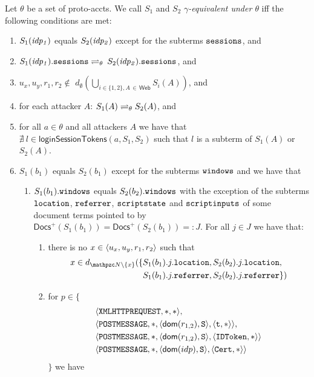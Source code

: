 \begin{theorem}
  \begin{definition}\label{def:rp:eq-of-states}
    Let $\theta$ be a set of proto-accts. %
    We call $S_1$ and $S_2$ \emph{$\gamma$-equivalent under 
    $\theta$} iff the following conditions are met:
    \begin{enumerate}
    \item\label{eqs:rp:idp} 
      $S_1(\mathit{idp_1})$ equals $S_2(\mathit{idp_2})$ except
      for the subterms $\mathtt{sessions}$, and
    \item\label{eqs:rp:idp-sessions} 
      $S_1(\mathit{idp_1}).\mathtt{sessions} \rightleftharpoons_{\theta}$ 
      $S_2(\mathit{idp_2}).\mathtt{sessions}$, and
    \item\label{eqs:rp:att-unknown}
      $u_x, u_y, r_1, r_2 \not\in $
      $d_\emptyset(\bigcup_{i\in\{1,2\},A\,\in\,\mathsf{Web}}S_i(A))$, and
    \item\label{eqs:rp:att} 
      for each attacker $A$:
      $S_1(A) \rightleftharpoons_{\theta} S_2(A)$, and
    \item\label{eqs:rp:att-not-l} 
      for all $a\in\theta$ and all attackers $A$ we have that
      $\nexists\ l \in \mathsf{loginSessionTokens}(a,S_1,S_2)$ 
      such that $l$ is a subterm of $S_1(A)$ or $S_2(A)$.
    \item\label{eqs:rp:b} 
      $S_1(b_1)$ equals $S_2(b_1)$ except for the subterms 
      $\mathtt{windows}$ and we have that
      \begin{enumerate}
      \item\label{eqs:rp:b:w}
        $S_1(b_1).\mathtt{windows}$ equals $S_2(b_2).\mathtt{windows}$ 
        with the exception of the subterms $\mathtt{location}$, $\mathtt{referrer}$, $\mathtt{scriptstate}$ 
        and $\mathtt{scriptinputs}$ of some document terms pointed 
        to by $\mathsf{Docs}^+(S_1(b_1)) = \mathsf{Docs}^+(S_2(b_1)) =: J$. 
        For all $j \in J$ we have that: 
        \begin{enumerate}
        \item there is no $x\in\langle {{}u_x, u_y, r_1, r_2} \rangle$ such that
          \begin{align*}
            x \in d_{\nonces \setminus \{x\}}(\{&S_1(b_1).j.\str{location}
            ,  S_2(b_2).j.\str{location},\\ & S_1(b_1).j.\str{referrer} , 
            S_2(b_2).j.\str{referrer}\})
          \end{align*}
        \item \label{eqs:rp:b:w:scriptinputs} for $p \in \{$
          \begin{align*}
            & \langle\mathtt{XMLHTTPREQUEST},*,*\rangle,\\
            & \langle\mathtt{POSTMESSAGE},*,\langle\mathsf{dom}(r_{1,2}), \mathtt{S}\rangle,\langle\mathtt{t}, *\rangle\rangle,\\
            & \langle\mathtt{POSTMESSAGE},*,\langle\mathsf{dom}(r_{1,2}), \mathtt{S}\rangle,\langle\mathtt{IDToken}, *\rangle\rangle\\
            & \langle\mathtt{POSTMESSAGE},*,\langle\mathsf{dom}(idp), \mathtt{S}\rangle,\langle\mathtt{Cert}, *\rangle\rangle
          \end{align*}
          $\}$ we have


\end{enumerate}
\end{enumerate}
\end{enumerate}
\end{definition}
\end{theorem}
